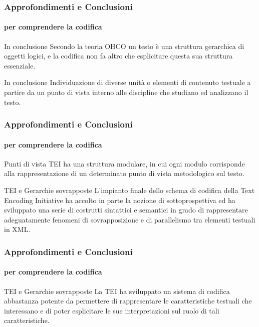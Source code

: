 \begin{frame}
	\frametitle{Approfondimenti e Conclusioni}
	\framesubtitle{per comprendere la codifica}
	\addtocounter{nframe}{1}

	\begin{block}{In conclusione}
		Secondo la teoria OHCO un testo è una struttura gerarchica di oggetti logici, e la codifica non fa altro che esplicitare questa sua struttura essenziale.
	\end{block}

	\begin{block}{In conclusione}
		Individuazione di diverse unità o elementi di contenuto testuale a partire da un punto di vista interno alle discipline che studiano ed analizzano il testo.
	\end{block}

\end{frame}


\begin{frame}
	\frametitle{Approfondimenti e Conclusioni}
	\framesubtitle{per comprendere la codifica}
	\addtocounter{nframe}{1}

	\begin{block}{Punti di vista}
		TEI ha una struttura modulare, in cui ogni modulo corrisponde alla rappresentazione di un determinato punto di vista metodologico sul testo.
	\end{block}

	\begin{block}{TEI e Gerarchie sovrapposte}
		L’impianto finale dello schema di codifica della Text Encoding Initiative ha accolto in parte la nozione di sottoprospettiva ed ha sviluppato una serie di costrutti sintattici e semantici in grado di rappresentare adeguatamente fenomeni di sovrapposizione e di parallelismo tra elementi testuali in XML.
	\end{block}


\end{frame}

\begin{frame}
	\frametitle{Approfondimenti e Conclusioni}
	\framesubtitle{per comprendere la codifica}
	\addtocounter{nframe}{1}

	\begin{block}{TEI e Gerarchie sovrapposte}
		La TEI ha sviluppato un sistema di codifica abbastanza potente da permettere di rappresentare le caratteristiche testuali che interessano e di poter esplicitare le sue interpretazioni sul ruolo di tali caratteristiche.
	\end{block}

\end{frame}

